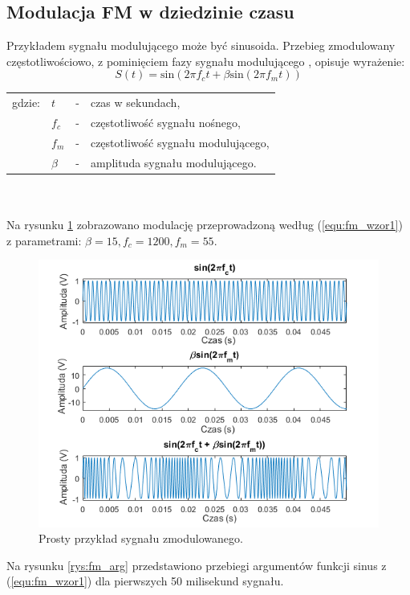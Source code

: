 \subsection{Modulacja FM w dziedzinie czasu}
Przykładem sygnału modulującego może być sinusoida. Przebieg zmodulowany częstotliwościowo, z pominięciem fazy sygnału modulującego \cite{oland}, opisuje wyrażenie:
\begin{equation} \label{equ:fm_wzor1}
S(t)= \text{sin}(2 \pi f_c t + \beta \text{sin}(2 \pi f_m t))
\end{equation}
\begin{tabular}{ l l l l}
	gdzie: & $t$ &  - & czas w sekundach, \\
	&	$f_c$ & - &  częstotliwość sygnału nośnego,\\
	&	$f_m$ & - &  częstotliwość sygnału modulującego,\\
	&	$\beta$ & - & amplituda sygnału modulującego.\\
\end{tabular} \\ \\
Na rysunku \ref{rys:fm_wykres1} zobrazowano modulację przeprowadzoną według (\ref{equ:fm_wzor1}) z parametrami: $\beta = 15, f_c = 1200, f_m = 55$.
\begin{figure}[H]
	\centering
	\includegraphics[width=12cm]{grafiki/fm_wykres1}
	\captionsetup{justification=centering}
	\caption{Prosty przykład sygnału zmodulowanego.}
	\label{rys:fm_wykres1}
\end{figure}
Na rysunku \ref{rys:fm_arg} przedstawiono przebiegi argumentów funkcji sinus z (\ref{equ:fm_wzor1}) dla pierwszych 50 milisekund sygnału.
